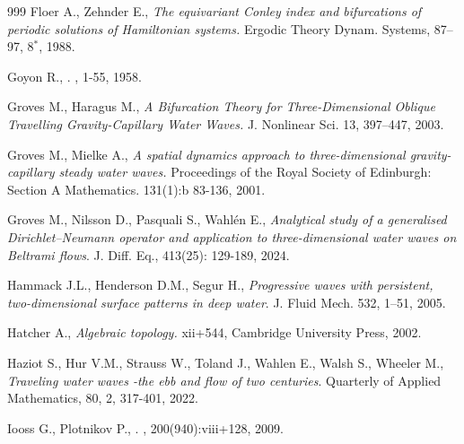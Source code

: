 \documentclass[11pt,a4paper,reqno]{article}
\numberwithin{equation}{section}
\theoremstyle{definition}
\begin{document}
\begin{footnotesize}
\begin{thebibliography}{999}
Floer  A., Zehnder  E., 
{\it The equivariant {C}onley index and bifurcations of periodic solutions of {H}amiltonian systems.} 
Ergodic Theory Dynam. Systems,
87--97, 8$^*$, 1988.


		Goyon R., 
		.
		, 1-55, 1958.


Groves M., Haragus M.,  {\it A Bifurcation Theory for Three-Dimensional Oblique Travelling Gravity-Capillary Water Waves.} J. Nonlinear Sci. 13, 397–447, 2003.

 Groves M., Mielke A., {\it A spatial dynamics approach to three-dimensional gravity-capillary steady water waves.} Proceedings of the Royal Society of Edinburgh: Section A Mathematics.  131(1):b 83-136, 2001.

 Groves M., Nilsson D., Pasquali S., Wahlén E., {\it Analytical study of a generalised Dirichlet–Neumann operator and application to three-dimensional water waves on Beltrami flows}.
J. Diff. Eq., 413(25): 129-189, 2024.

Hammack J.L.,  Henderson
D.M., Segur H., 
{\it Progressive waves with persistent, two-dimensional surface patterns in deep water}. J. Fluid Mech.
532,  1–51, 2005.


	Hatcher A., 
    {\it Algebraic topology.} xii+544,
Cambridge University Press,  2002.

Haziot S.,  Hur V.M., Strauss W., Toland J., 
Wahlen E.,  Walsh S.,  Wheeler M.,
{\it Traveling water waves -the ebb and flow of two centuries}. 
Quarterly of Applied Mathematics, 80, 2, 317-401, 2022. 


Iooss G., Plotnikov P.,
. 
, 200(940):viii+128, 2009.


\end{thebibliography}
\end{footnotesize}
\end{document}
